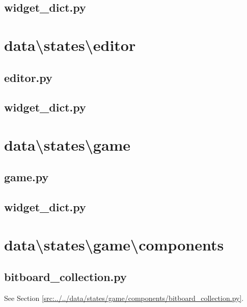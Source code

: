 \documentclass[../main/main.tex]{subfiles}
\begin{document}
\subsection{widget\_dict.py}

\label{src:data/states/config/widget_dict.py}

\section{data\textbackslash states\textbackslash editor}
\subsection{editor.py}

\label{src:data/states/editor/editor.py}

\subsection{widget\_dict.py}

\label{src:data/states/editor/widget_dict.py}

\section{data\textbackslash states\textbackslash game}
\subsection{game.py}

\label{src:data/states/game/game.py}

\subsection{widget\_dict.py}

\label{src:data/states/game/widget_dict.py}

\section{data\textbackslash states\textbackslash game\textbackslash components}
\subsection{bitboard\_collection.py}
See Section \ref{src:../../data/states/game/components/bitboard_collection.py}.
\end{document}
